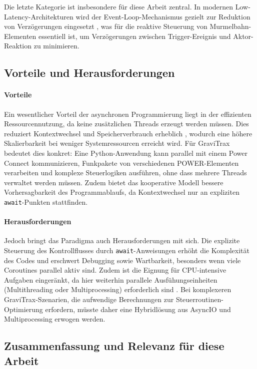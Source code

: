 Die letzte Kategorie ist insbesondere für diese Arbeit zentral. In modernen Low-Latency-Architekturen wird der Event-Loop-Mechanismus gezielt zur Reduktion von Verzögerungen eingesetzt \cite{umer2025}, was für die reaktive Steuerung von Murmelbahn-Elementen essentiell ist, um Verzögerungen zwischen Trigger-Ereignis und Aktor-Reaktion zu minimieren.

\subsection{Vorteile und Herausforderungen}

\paragraph{Vorteile}
Ein wesentlicher Vorteil der asynchronen Programmierung liegt in der effizienten Ressourcennutzung, da keine zusätzlichen Threads erzeugt werden müssen.
Dies reduziert Kontextwechsel und Speicherverbrauch erheblich \cite{ziade2017}, wodurch eine höhere Skalierbarkeit bei weniger Systemressourcen erreicht wird.
Für GraviTrax bedeutet dies konkret: Eine Python-Anwendung kann parallel mit einem Power Connect kommunizieren, Funkpakete von verschiedenen POWER-Elementen verarbeiten und komplexe Steuerlogiken ausführen, ohne dass mehrere Threads verwaltet werden müssen.
Zudem bietet das kooperative Modell bessere Vorhersagbarkeit des Programmablaufs, da Kontextwechsel nur an expliziten \texttt{await}-Punkten stattfinden.

\paragraph{Herausforderungen}
Jedoch bringt das Paradigma auch Herausforderungen mit sich.
Die explizite Steuerung des Kontrollflusses durch \texttt{await}-Anweisungen erhöht die Komplexität des Codes und erschwert Debugging sowie Wartbarkeit, besonders wenn viele Coroutines parallel aktiv sind.
Zudem ist die Eignung für CPU-intensive Aufgaben eingeränkt, da hier weiterhin parallele Ausfühungseinheiten (Multithreading oder Multiprocessing) erforderlich sind \cite{hattingh2020}.
Bei komplexeren GraviTrax-Szenarien, die aufwendige Berechnungen zur Steuerroutinen-Optimierung erfordern, müsste daher eine Hybridlösung aus AsyncIO und Multiprocessing erwogen werden.

\subsection{Zusammenfassung und Relevanz für diese Arbeit}

